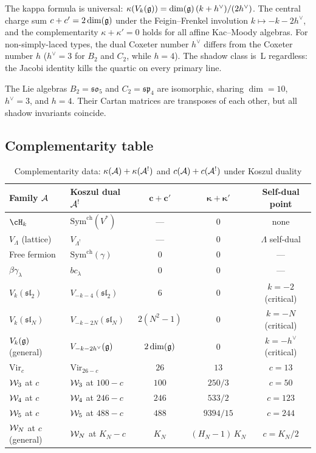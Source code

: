\noindent
The kappa formula is universal:
$\kappa(V_k(\mathfrak{g})) = \dim(\mathfrak{g})\,(k + h^\vee)/(2h^\vee)$.
The central charge sum $c + c' = 2\dim(\mathfrak{g})$ under the
Feigin--Frenkel involution $k \mapsto -k - 2h^\vee$, and
the complementarity $\kappa + \kappa' = 0$ holds for all
affine Kac--Moody algebras. For non-simply-laced types,
the dual Coxeter number $h^\vee$ differs from the Coxeter
number $h$ ($h^\vee = 3$ for $B_2$ and $C_2$, while $h = 4$).
The shadow class is~L regardless: the Jacobi identity kills the
quartic on every primary line.

\begin{remark}[$B_2$/$C_2$ isomorphism]
The Lie algebras $B_2 = \mathfrak{so}_5$ and
$C_2 = \mathfrak{sp}_4$ are isomorphic, sharing $\dim = 10$,
$h^\vee = 3$, and $h = 4$. Their Cartan matrices are transposes
of each other, but all shadow invariants coincide.
\end{remark}


\subsection{Complementarity table}\label{ssec:complementarity-table}

\begin{table}[ht]
\centering
\caption{Complementarity data: $\kappa(\mathcal{A}) + \kappa(\mathcal{A}^!)$ and
$c(\mathcal{A}) + c(\mathcal{A}^!)$ under Koszul duality}
\label{tab:complementarity}
\renewcommand{\arraystretch}{1.35}
{\small
\begin{tabular}{llccc}
\toprule
\textbf{Family $\mathcal{A}$}
 & \textbf{Koszul dual $\mathcal{A}^!$}
 & $\boldsymbol{c + c'}$
 & $\boldsymbol{\kappa + \kappa'}$
 & \textbf{Self-dual point} \\
\midrule
$\cH_k$
 & $\mathrm{Sym}^{\mathrm{ch}}(V^*)$
 & --- & $0$ & none \\
$V_\Lambda$ (lattice)
 & $V_{\Lambda^!}$
 & --- & $0$ & $\Lambda$ self-dual \\
Free fermion
 & $\mathrm{Sym}^{\mathrm{ch}}(\gamma)$
 & $0$ & $0$ & --- \\
$\beta\gamma_\lambda$
 & $bc_\lambda$
 & $0$ & $0$ & --- \\[3pt]
\midrule
$V_k(\mathfrak{sl}_2)$
 & $V_{-k-4}(\mathfrak{sl}_2)$
 & $6$ & $0$ & $k = -2$ (critical) \\
$V_k(\mathfrak{sl}_N)$
 & $V_{-k-2N}(\mathfrak{sl}_N)$
 & $2(N^2{-}1)$ & $0$ & $k = -N$ (critical) \\
$V_k(\mathfrak{g})$ (general)
 & $V_{-k-2h^\vee}(\mathfrak{g})$
 & $2\dim(\mathfrak{g})$ & $0$ & $k = -h^\vee$ (critical) \\[3pt]
\midrule
$\mathrm{Vir}_c$
 & $\mathrm{Vir}_{26-c}$
 & $26$ & $13$ & $c = 13$ \\
$\mathcal{W}_3$ at $c$
 & $\mathcal{W}_3$ at $100{-}c$
 & $100$ & $250/3$ & $c = 50$ \\
$\mathcal{W}_4$ at $c$
 & $\mathcal{W}_4$ at $246{-}c$
 & $246$ & $533/2$ & $c = 123$ \\
$\mathcal{W}_5$ at $c$
 & $\mathcal{W}_5$ at $488{-}c$
 & $488$ & $9394/15$ & $c = 244$ \\
$\mathcal{W}_N$ at $c$ (general)
 & $\mathcal{W}_N$ at $K_N{-}c$
 & $K_N$ & $(H_N{-}1)\,K_N$ & $c = K_N/2$ \\
\bottomrule
\end{tabular}
}
\end{table}

